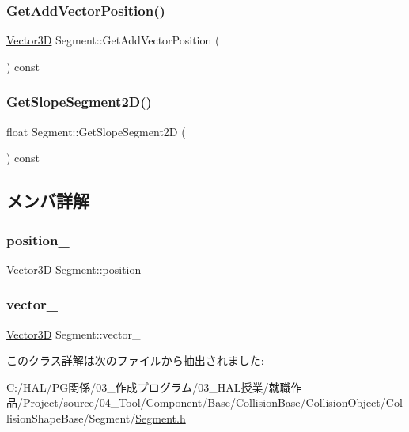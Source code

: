 \subsubsection{\texorpdfstring{Get\+Add\+Vector\+Position()}{GetAddVectorPosition()}}
{\footnotesize\ttfamily \mbox{\hyperlink{class_vector3_d}{Vector3D}} Segment\+::\+Get\+Add\+Vector\+Position (\begin{DoxyParamCaption}{ }\end{DoxyParamCaption}) const\hspace{0.3cm}{\ttfamily [inline]}}

\mbox{\label{class_segment_a889d62f6d4c10701464726da706ae043}} 
\subsubsection{\texorpdfstring{Get\+Slope\+Segment2\+D()}{GetSlopeSegment2D()}}
{\footnotesize\ttfamily float Segment\+::\+Get\+Slope\+Segment2D (\begin{DoxyParamCaption}{ }\end{DoxyParamCaption}) const\hspace{0.3cm}{\ttfamily [inline]}}



\subsection{メンバ詳解}
\mbox{\label{class_segment_aee447b161d940d22e9aa222091789e08}} 
\subsubsection{\texorpdfstring{position\+\_\+}{position\_}}
{\footnotesize\ttfamily \mbox{\hyperlink{class_vector3_d}{Vector3D}} Segment\+::position\+\_\+}

\mbox{\label{class_segment_a6834b88ecae688f0fc5b4ed95fab824b}} 
\subsubsection{\texorpdfstring{vector\+\_\+}{vector\_}}
{\footnotesize\ttfamily \mbox{\hyperlink{class_vector3_d}{Vector3D}} Segment\+::vector\+\_\+}



このクラス詳解は次のファイルから抽出されました\+:\begin{DoxyCompactItemize}
\item 
C\+:/\+H\+A\+L/\+P\+G関係/03\+\_\+作成プログラム/03\+\_\+\+H\+A\+L授業/就職作品/\+Project/source/04\+\_\+\+Tool/\+Component/\+Base/\+Collision\+Base/\+Collision\+Object/\+Collision\+Shape\+Base/\+Segment/\mbox{\hyperlink{_segment_8h}{Segment.\+h}}\end{DoxyCompactItemize}
